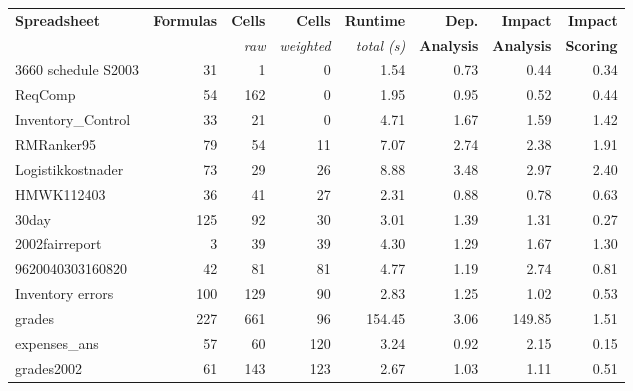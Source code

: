 \begin{table}[!b]
  \centering \begin{tabular}{l|rrr||r|rrr}
 \small{\bf{Spreadsheet}} & \small{\bf{Formulas}} & \small{\bf{Cells}} & \small{\bf{Cells}} & \small{\bf{Runtime}} & \small{\bf{Dep.}} & \small{\bf{Impact}}   & \small{\bf{Impact}} \\
 & & {\small{\it{raw}}} & {\small{\it{weighted}}} & \small{\it{total (s)}} & \small{\bf{Analysis}} & \small{\bf{Analysis}} & \small{\bf{Scoring}} \\
\hline
\small{3660 schedule S2003} & \small{31} & \small{1} & \small{0} & \small{1.54} & \small{0.73} & \small{0.44} & \small{0.34} \\ 
\small{ReqComp} & \small{54} & \small{162} & \small{0} & \small{1.95} & \small{0.95} & \small{0.52} & \small{0.44} \\ 
\small{Inventory\_Control} & \small{33} & \small{21} & \small{0} & \small{4.71} & \small{1.67} & \small{1.59} & \small{1.42} \\ 
\small{RMRanker95} & \small{79} & \small{54} & \small{11} & \small{7.07} & \small{2.74} & \small{2.38} & \small{1.91} \\ 
\small{Logistikkostnader} & \small{73} & \small{29} & \small{26} & \small{8.88} & \small{3.48} & \small{2.97} & \small{2.40} \\  
\small{HMWK112403} & \small{36} & \small{41} & \small{27} & \small{2.31} & \small{0.88} & \small{0.78} & \small{0.63} \\ 
\small{30day} & \small{125} & \small{92} & \small{30} & \small{3.01} & \small{1.39} & \small{1.31} & \small{0.27} \\ 
\small{2002fairreport} & \small{3} & \small{39} & \small{39} & \small{4.30} & \small{1.29} & \small{1.67} & \small{1.30} \\ 
\small{9620040303160820} & \small{42} & \small{81} & \small{81} & \small{4.77} & \small{1.19} & \small{2.74} & \small{0.81} \\  
\small{Inventory errors} & \small{100} & \small{129} & \small{90} & \small{2.83} & \small{1.25} & \small{1.02} & \small{0.53} \\ 
\small{grades} & \small{227} & \small{661} & \small{96} & \small{154.45} & \small{3.06} & \small{149.85} & \small{1.51} \\ 
\small{expenses\_ans} & \small{57} & \small{60} & \small{120} & \small{3.24} & \small{0.92} & \small{2.15} & \small{0.15} \\ 
\small{grades2002} & \small{61} & \small{143} & \small{123} & \small{2.67} & \small{1.03} & \small{1.11} & \small{0.51} \\ 

\end{tabular}
\end{table}
